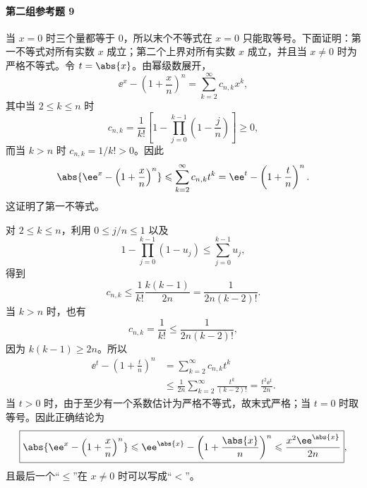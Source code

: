 \paragraph{第二组参考题 9}
\begin{xsolution}
当 $x=0$ 时三个量都等于 $0$，所以末个不等式在 $x=0$ 只能取等号。下面证明：第一不等式对所有实数 $x$ 成立；第二个上界对所有实数 $x$ 成立，并且当 $x\ne0$ 时为严格不等式。令 $t=\abs{x}$。由幂级数展开，
\[
  \ee^x-\left(1+\frac xn\right)^n
  =\sum_{k=2}^{\infty}c_{n,k}x^k,
\]
其中当 $2\leqslant k\leqslant n$ 时
\[
  c_{n,k}
  =\frac1{k!}\left[1-\prod_{j=0}^{k-1}\left(1-\frac jn\right)\right]\geqslant0,
\]
而当 $k>n$ 时 $c_{n,k}=1/k!>0$。因此
\[
  \abs{\ee^x-\left(1+\frac xn\right)^n}
  \leqslant\sum_{k=2}^{\infty}c_{n,k}t^k
  =\ee^t-\left(1+\frac tn\right)^n.
\]
这证明了第一不等式。

对 $2\leqslant k\leqslant n$，利用 $0\leqslant j/n\leqslant1$ 以及
\[
  1-\prod_{j=0}^{k-1}(1-u_j)
  \leqslant\sum_{j=0}^{k-1}u_j,
\]
得到
\[
  c_{n,k}
  \leqslant\frac1{k!}\frac{k(k-1)}{2n}
  =\frac1{2n(k-2)!}.
\]
当 $k>n$ 时，也有
\[
  c_{n,k}=\frac1{k!}
  \leqslant\frac1{2n(k-2)!},
\]
因为 $k(k-1)\geqslant2n$。所以
\[
\begin{aligned}
  \ee^t-\left(1+\frac tn\right)^n
  &=\sum_{k=2}^{\infty}c_{n,k}t^k\\
  &\leqslant\frac1{2n}\sum_{k=2}^{\infty}
    \frac{t^k}{(k-2)!}
  =\frac{t^2\ee^t}{2n}.
\end{aligned}
\]
当 $t>0$ 时，由于至少有一个系数估计为严格不等式，故末式严格；当 $t=0$ 时取等号。因此正确结论为
\[
  \boxed{
  \abs{\ee^x-\left(1+\frac xn\right)^n}
  \leqslant \ee^{\abs{x}}-
  \left(1+\frac{\abs{x}}n\right)^n
  \leqslant\frac{x^2\ee^{\abs{x}}}{2n}},
\]
且最后一个“$\leqslant$”在 $x\ne0$ 时可以写成“$<$”。
\end{xsolution}

